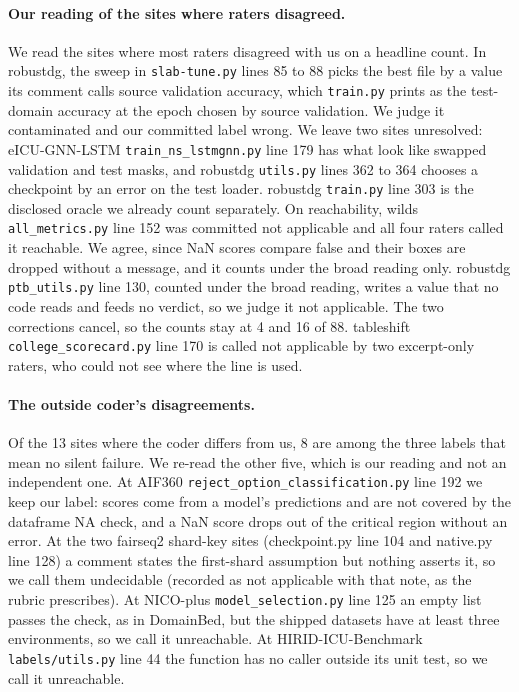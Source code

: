 \documentclass[10pt]{article}
\theoremstyle{definition}
\begin{document}
\paragraph{Our reading of the sites where raters disagreed.} We read the sites where most raters disagreed with us on a headline count. In robustdg, the sweep in \texttt{slab-tune.py} lines 85 to 88 picks the best file by a value its comment calls source validation accuracy, which \texttt{train.py} prints as the test-domain accuracy at the epoch chosen by source validation. We judge it contaminated and our committed label wrong. We leave two sites unresolved: eICU-GNN-LSTM \texttt{train\_ns\_lstmgnn.py} line 179 has what look like swapped validation and test masks, and robustdg \texttt{utils.py} lines 362 to 364 chooses a checkpoint by an error on the test loader. robustdg \texttt{train.py} line 303 is the disclosed oracle we already count separately. On reachability, wilds \texttt{all\_metrics.py} line 152 was committed not applicable and all four raters called it reachable. We agree, since NaN scores compare false and their boxes are dropped without a message, and it counts under the broad reading only. robustdg \texttt{ptb\_utils.py} line 130, counted under the broad reading, writes a value that no code reads and feeds no verdict, so we judge it not applicable. The two corrections cancel, so the counts stay at 4 and 16 of 88. tableshift \texttt{college\_scorecard.py} line 170 is called not applicable by two excerpt-only raters, who could not see where the line is used.

\paragraph{The outside coder's disagreements.} Of the 13 sites where the coder differs from us, 8 are among the three labels that mean no silent failure. We re-read the other five, which is our reading and not an independent one. At AIF360 \texttt{reject\_option\_classification.py} line 192 we keep our label: scores come from a model's predictions and are not covered by the dataframe NA check, and a NaN score drops out of the critical region without an error. At the two fairseq2 shard-key sites (checkpoint.py line 104 and native.py line 128) a comment states the first-shard assumption but nothing asserts it, so we call them undecidable (recorded as not applicable with that note, as the rubric prescribes). At NICO-plus \texttt{model\_selection.py} line 125 an empty list passes the check, as in DomainBed, but the shipped datasets have at least three environments, so we call it unreachable. At HIRID-ICU-Benchmark \texttt{labels/utils.py} line 44 the function has no caller outside its unit test, so we call it unreachable.
\end{document}
